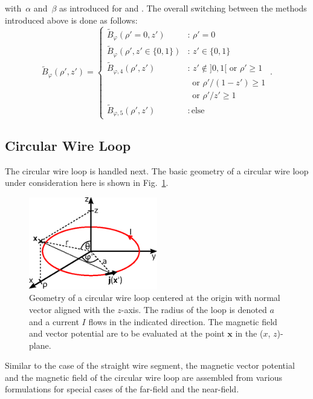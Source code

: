 with~$\alpha$ and~$\beta$ as introduced for  and .
%
%
The overall switching between the methods introduced above is done as follows:
\begin{equation}
  \tilde{B}_\varphi (\rho', z')
  = \begin{cases}
      \tilde{B}_\varphi(\rho'=0, z')             &:\, \rho' = 0 \\
      \tilde{B}_\varphi(\rho', z' \in \{0, 1\})  &:\, z' \in \{0, 1\} \\
      \tilde{B}_{\varphi,4} (\rho', z') &:\, z' \notin ]0,1[ \textrm{ or } \rho' \geq 1 \\
                                   ~    & ~ \textrm{ or } \rho'/(1-z') \geq 1  \\
                                   ~    & ~ \textrm{ or } \rho'/z'   \geq 1 \\
      \tilde{B}_{\varphi,5} (\rho', z') &:\, \textrm{else}
    \end{cases} \, .
\end{equation}

\subsection{Circular Wire Loop}
The circular wire loop is handled next.
The basic geometry of a circular wire loop under consideration here is shown in Fig.~\ref{fig:circularWireLoop}.
\begin{figure}[htbp]
 \centering
 \includegraphics[width=0.5\textwidth]{img/circularWireLoop.eps}
 \caption{Geometry of a circular wire loop centered at the origin with normal vector aligned with the $z$-axis.
          The radius of the loop is denoted $a$ and a current $I$ flows in the indicated direction.
          The magnetic field and vector potential are to be evaluated at the point $\mathbf{x}$ in the ($x$, $z$)-plane.}
 \label{fig:circularWireLoop}
\end{figure}

Similar to the case of the straight wire segment,
the magnetic vector potential and the magnetic field of the circular wire loop
are assembled from various formulations for special cases of the far-field and the near-field.

